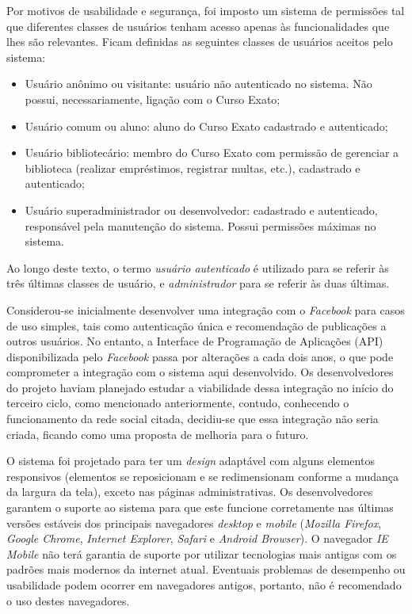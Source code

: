 \documentclass[a4paper]{article}
\begin{document}
Por motivos de usabilidade e segurança, foi imposto um sistema de permissões tal que diferentes classes de usuários tenham acesso apenas às funcionalidades que lhes são relevantes. Ficam definidas as seguintes classes de usuários aceitos pelo sistema:
\begin{itemize}
\item Usuário anônimo ou visitante: usuário não autenticado no sistema. Não possui, necessariamente, ligação com o Curso Exato;
\item Usuário comum ou aluno: aluno do Curso Exato cadastrado e autenticado;
\item Usuário bibliotecário: membro do Curso Exato com permissão de gerenciar a biblioteca (realizar empréstimos, registrar multas, etc.), cadastrado e autenticado;
\item Usuário superadministrador ou desenvolvedor: cadastrado e autenticado, responsável pela manutenção do sistema. Possui permissões máximas no sistema.
\end{itemize}
Ao longo deste texto, o termo \emph{usuário autenticado} é utilizado para se referir às três últimas classes de usuário, e \emph{administrador} para se referir às duas últimas.

Considerou-se inicialmente desenvolver uma integração com o \textit{Facebook} para casos de uso simples, tais como autenticação única e recomendação de publicações a outros usuários. No entanto, a Interface de Programação de Aplicações (API) disponibilizada pelo \textit{Facebook} passa por alterações a cada dois anos, o que pode comprometer a integração com o sistema aqui desenvolvido. Os  desenvolvedores do projeto haviam planejado estudar a viabilidade dessa integração no início do terceiro ciclo, como mencionado anteriormente, contudo, conhecendo o funcionamento da rede social citada, decidiu-se que essa integração não seria criada, ficando como uma proposta de melhoria para o futuro.

O sistema foi projetado para ter um \textit{design} adaptável com alguns elementos responsivos (elementos se reposicionam e se redimensionam conforme a mudança da largura da tela), exceto nas páginas administrativas. Os desenvolvedores garantem o suporte ao sistema para que este funcione corretamente nas últimas versões estáveis dos principais navegadores \textit{desktop} e \textit{mobile} (\textit{Mozilla Firefox}, \textit{Google Chrome}, \textit{Internet Explorer}, \textit{Safari} e \textit{Android Browser}). O navegador \textit{IE Mobile} não terá garantia de suporte por utilizar tecnologias mais antigas com os padrões mais modernos da internet atual. Eventuais problemas de desempenho ou usabilidade podem ocorrer em navegadores antigos, portanto, não é recomendado o uso destes navegadores. 
\end{document}
